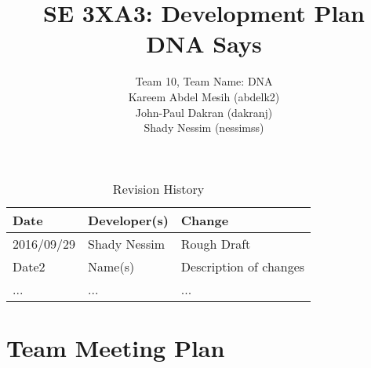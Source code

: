 \documentclass{article}
\title{SE 3XA3: Development Plan\\DNA Says}
\author{Team 10, Team Name: DNA
		\\ Kareem Abdel Mesih (abdelk2)
		\\ John-Paul Dakran (dakranj)
		\\ Shady Nessim (nessimss)
}
\date{}
\begin{document}
\begin{table}[hp]
\caption{Revision History} \label{TblRevisionHistory}
\begin{tabularx}{\textwidth}{llX}
\toprule
\textbf{Date} & \textbf{Developer(s)} & \textbf{Change}\\
\midrule
2016/09/29 & Shady Nessim & Rough Draft\\
Date2 & Name(s) & Description of changes\\
... & ... & ...\\
\bottomrule
\end{tabularx}
\end{table}
\newpage
\maketitle

\section{Team Meeting Plan}
\end{document}
